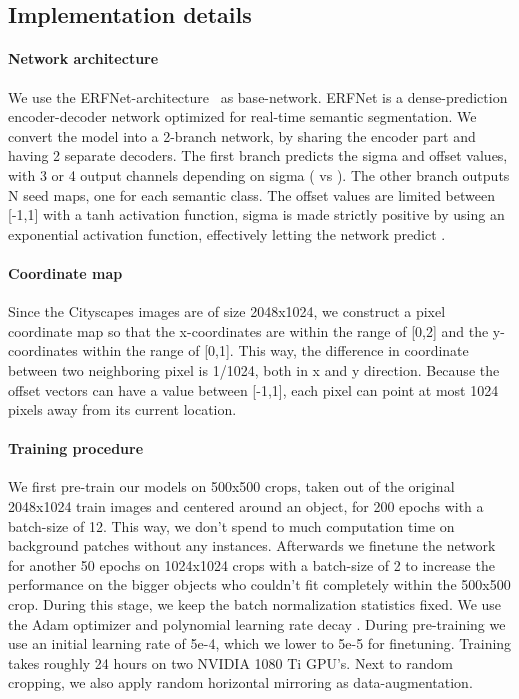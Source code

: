 \subsection{Implementation details}

\paragraph{Network architecture} We use the ERFNet-architecture~\cite{romera2018erfnet} as base-network. ERFNet is a dense-prediction encoder-decoder network optimized for real-time semantic segmentation. We convert the model into a 2-branch network, by sharing the encoder part and having 2 separate decoders. The first branch predicts the sigma and offset values, with 3 or 4 output channels depending on sigma ( vs ). The other branch outputs N seed maps, one for each semantic class. The offset values are limited between [-1,1] with a tanh activation function, sigma is made strictly positive by using an exponential activation function, effectively letting the network predict .

\paragraph{Coordinate map} Since the Cityscapes images are of size 2048x1024, we construct a pixel coordinate map so that the x-coordinates are within the range of [0,2] and the y-coordinates within the range of [0,1]. This way, the difference in coordinate between two neighboring pixel is 1/1024, both in x and y direction. Because the offset vectors can have a value between [-1,1], each pixel can point at most 1024 pixels away from its current location. 

\paragraph{Training procedure} We first pre-train our models on 500x500 crops, taken out of the original 2048x1024 train images and centered around an object, for 200 epochs with a batch-size of 12. This way, we don't spend to much computation time on background patches without any instances. Afterwards we finetune the network for another 50 epochs on 1024x1024 crops with a batch-size of 2 to increase the performance on the bigger objects who couldn't fit completely within the 500x500 crop. During this stage, we keep the batch normalization statistics fixed. We use the Adam optimizer and polynomial learning rate decay . During pre-training we use an initial learning rate of 5e-4, which we lower to 5e-5 for finetuning. Training takes roughly 24 hours on two NVIDIA 1080 Ti GPU's. Next to random cropping, we also apply random horizontal mirroring as data-augmentation.

